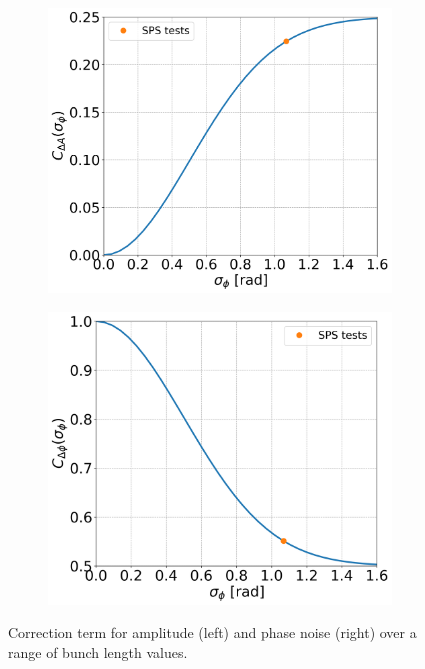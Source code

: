 \begin{figure}[!ht]
    \centering
    \begin{subfigure}[t]{0.45\textwidth}
        \centering
        \includegraphics[width=1\textwidth]{images/Ch3/CA_bunch_length_dependence.png}
    \end{subfigure}
    \hfill
    \begin{subfigure}[t]{0.45\textwidth}
        \centering
        \includegraphics[width=1\textwidth]{images/Ch3/Cphi_bunch_length_dependence.png}
    \end{subfigure}
    \hfill
     \caption{Correction term for amplitude (left) and phase noise (right) over a range of bunch length values.} %
     \label{fig:correction_term_bunch_length}
 \end{figure}

